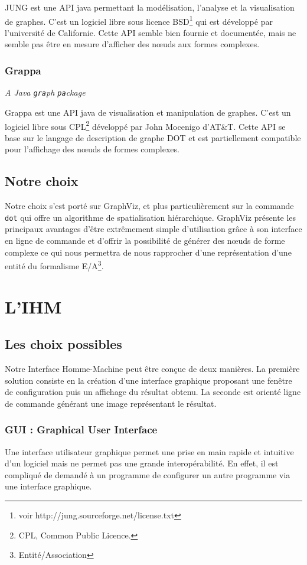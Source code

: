 				JUNG est une API java permettant la modélisation, l'analyse et la visualisation de graphes. C'est un logiciel libre sous licence BSD\footnote{voir http://jung.sourceforge.net/license.txt} qui est développé par l'université de Californie. Cette API semble bien fournie et documentée, mais ne semble pas être en mesure d'afficher des nœuds aux formes complexes. 
		\subsubsection{Grappa} \textit{A Java \texttt{gra}ph \texttt{pa}ckage}
		
			Grappa est une API java de visualisation et manipulation de graphes. C'est un logiciel libre sous CPL\footnote{CPL, Common Public Licence.} développé par John Mocenigo d'AT\&T. Cette API se base sur le langage de description de graphe DOT et est partiellement compatible pour l'affichage des nœuds de formes complexes.
		
				
  \subsection{Notre choix}
		Notre choix s'est porté sur GraphViz, et plus particulièrement sur la commande \texttt{dot} qui offre un algorithme de spatialisation hiérarchique. GraphViz présente les principaux avantages d'être extrêmement simple d'utilisation grâce à son interface en ligne de commande et d'offrir la possibilité de générer des nœuds de forme complexe ce qui nous permettra de nous rapprocher d'une représentation d'une entité du formalisme E/A\footnote{Entité/Association}.

\section{L'IHM}	
	\subsection{Les choix possibles}
	\label{ihm_choix_possibles}
		Notre Interface Homme-Machine peut être conçue de deux manières. La première solution consiste en la création d'une interface graphique proposant une fenêtre de configuration puis un affichage du résultat obtenu. La seconde est orienté ligne de commande générant une image représentant le résultat. 	
	
		\subsubsection{GUI : \og Graphical User Interface \fg{}}
			Une interface utilisateur graphique permet une prise en main rapide et intuitive d'un logiciel mais ne permet pas une grande interopérabilité. En effet, il est compliqué de demandé à un programme de configurer un autre programme via une interface graphique.
			
